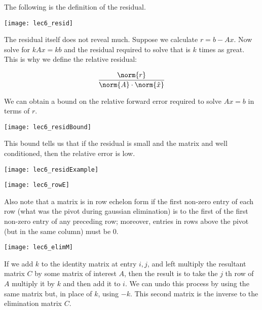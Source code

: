\documentclass[../main.tex]{subfiles}
\begin{document}
The following is the definition of the residual.
\begin{center}
    \texttt{[image: lec6\_resid]}
\end{center}

\begin{remark}
    The residual itself does not reveal much. Suppose we calculate $r = b - Ax$. Now solve for $kAx = kb$ and the residual required to solve that is $k$ times as great. This is why we define the relative residual:

    \[
        \frac{\norm{r}}{\norm{A} \cdot \norm{\hat{x}}}
    \]
\end{remark}

We can obtain a bound on the relative forward error required to solve $Ax = b$ in terms of $r$.
\begin{center}
    \texttt{[image: lec6\_residBound]}
\end{center}

\begin{remark}
    This bound tells us that if the residual is small and the matrix and well conditioned, then the relative error is low.
\end{remark}

\begin{center}
    \texttt{[image: lec6\_residExample]}
\end{center}

\begin{center}
    \texttt{[image: lec6\_rowE]}
\end{center}

\begin{remark}
    Also note that a matrix is in row echelon form if the first non-zero entry of each row (what was the pivot during gaussian elimination) is to the first of the first non-zero entry of any preceding row; moreover, entries in rows above the pivot (but in the same column) must be $0$.
\end{remark}

\begin{center}
    \texttt{[image: lec6\_elimM]}
\end{center}

\begin{remark}
    If we add $k$ to the identity matrix at entry $i,j$, and left multiply the resultant
    matrix $C$ by some matrix of interest $A$, then the result is to take the $j$ th row of $A$
    multiply it by $k$ and then add it to $i$. We can undo this process by using the same
    matrix but, in place of $k$, using $-k$. This second matrix is the inverse to the elimination matrix $C$.
\end{remark}
\end{document}
